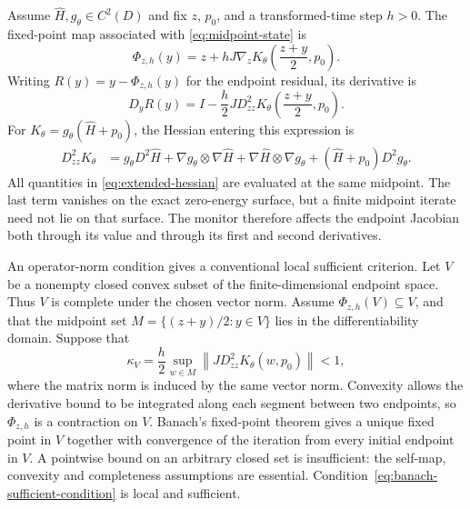 \documentclass[final,3p,times]{elsarticle}
\begin{document}
Assume $\widehat H,g_\theta\in C^2(D)$ and fix $z$, $p_0$, and a
transformed-time step $h>0$. The fixed-point map
associated with \eqref{eq:midpoint-state} is
\begin{equation}
 \Phi_{z,h}(y)=z+hJ\nabla_zK_\theta\!\left(\frac{z+y}{2},p_0\right).
 \label{eq:fixed-point-map}
\end{equation}
Writing $R(y)=y-\Phi_{z,h}(y)$ for the endpoint residual, its derivative is
\begin{equation}
 D_yR(y)=I-\frac{h}{2}J D^2_{zz}K_\theta
              \!\left(\frac{z+y}{2},p_0\right).
 \label{eq:residual-jacobian}
\end{equation}
For $K_\theta=g_\theta(\widehat H+p_0)$, the Hessian entering this expression
is
\begin{align}
 D^2_{zz}K_\theta
 &=g_\theta D^2\widehat H
   +\nabla g_\theta\otimes\nabla\widehat H
   +\nabla\widehat H\otimes\nabla g_\theta
   +(\widehat H+p_0)D^2g_\theta .
 \label{eq:extended-hessian}
\end{align}
All quantities in \eqref{eq:extended-hessian} are evaluated at the same
midpoint. The last term vanishes on the exact zero-energy surface, but a
finite midpoint iterate need not lie on that surface. The monitor therefore
affects the endpoint Jacobian both through its value and through its first
and second derivatives.

An operator-norm condition gives a conventional local sufficient criterion.
Let $V$ be a nonempty closed convex subset of the finite-dimensional
endpoint space. Thus $V$ is complete under the chosen vector norm. Assume
$\Phi_{z,h}(V)\subseteq V$, and that the midpoint set
$M=\{(z+y)/2:y\in V\}$ lies in the differentiability domain. Suppose that
\begin{equation}
 \kappa_V=\frac{h}{2}\sup_{w\in M}
       \left\|J D^2_{zz}K_\theta(w,p_0)\right\|<1,
 \label{eq:banach-sufficient-condition}
\end{equation}
where the matrix norm is induced by the same vector norm. Convexity allows
the derivative bound to be integrated along each segment between two
endpoints, so $\Phi_{z,h}$ is a contraction on $V$. Banach's fixed-point theorem
gives a unique fixed point in $V$ together with convergence of the iteration
from every initial endpoint in $V$. A pointwise bound on an arbitrary closed set is insufficient: the self-map,
convexity and completeness assumptions are essential.
Condition~\eqref{eq:banach-sufficient-condition} is local and sufficient.
\end{document}
